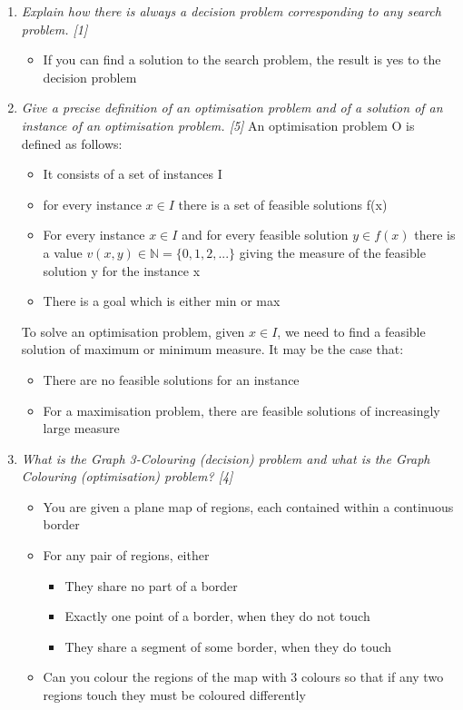 \documentclass{article}[18pt]
\begin{document}
\begin{enumerate}
	\item \textit{Explain how there is always a decision problem corresponding to any
		search problem. [1]}
	\begin{itemize}
		\item If you can find a solution to the search problem, the result is yes to the decision problem
	\end{itemize}
	\item \textit{Give a precise definition of an optimisation problem and of a solution
		of an instance of an optimisation problem. [5]}
	An optimisation problem O is defined as follows:
	\begin{itemize}
		\item It consists of a set of instances I
		\item for every instance $x\in I$ there is a set of feasible solutions f(x)
		\item For every instance $x\in I$ and for every feasible solution $y\in f(x)$ there is a value $v(x,y)\in \mathbb{N}=\{0,1,2,...\}$ giving the measure of the feasible solution y for the instance x
		\item There is a goal which is either min or max
	\end{itemize}
	To solve an optimisation problem, given $x\in I$, we need to find a feasible solution of maximum or minimum measure. It may be the case that:
	\begin{itemize}
		\item There are no feasible solutions for an instance
		\item For a maximisation problem, there are feasible solutions of increasingly large measure
	\end{itemize}
	
	\item \textit{What is the Graph 3-Colouring (decision) problem and what is the
		Graph Colouring (optimisation) problem? [4]}
	\begin{itemize}
		\item You are given a plane map of regions, each contained within a continuous border
		\item For any pair of regions, either
		\begin{itemize}
			\item They share no part of a border
			\item Exactly one point of a border, when they do not touch
			\item They share a segment of some border, when they do touch
		\end{itemize}
		\item Can you colour the regions of the map with 3 colours so that if any two regions touch they must be coloured differently
	\end{itemize}
	

\end{enumerate}
\end{document}
